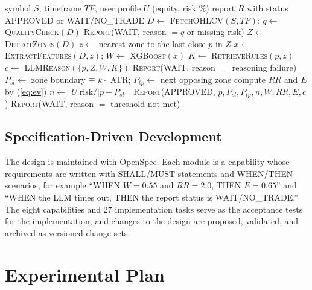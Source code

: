 \documentclass[conference]{IEEEtran}
\begin{document}
\begin{algorithm}[t]
\caption{Hybrid TPA-Agent Analysis Cycle}
\label{alg:tpa}
\small
\begin{algorithmic}[1]
\Require symbol $S$, timeframe $TF$, user profile $U$ (equity, risk \%)
\Ensure report $R$ with status APPROVED or WAIT/NO\_TRADE
\State $D \gets$ \textsc{FetchOHLCV}$(S, TF)$; $q \gets$ \textsc{QualityCheck}$(D)$
  \State \Return \textsc{Report}(WAIT, reason $=q$ or missing risk)
\EndIf
\State $Z \gets$ \textsc{DetectZones}$(D)$ 
\State $z \gets$ nearest zone to the last close $p$ in $Z$
\State $x \gets$ \textsc{ExtractFeatures}$(D, z)$; $W \gets$ \textsc{XGBoost}$(x)$ 
\State $K \gets$ \textsc{RetrieveRules}$(p, z)$
\State $c \gets$ \textsc{LLMReason}$(\{p, Z, W, K\})$ 
  \State \Return \textsc{Report}(WAIT, reason $=$ reasoning failure)
\EndIf
\State $P_{sl} \gets$ zone boundary $\mp$ $k \cdot$ ATR; $P_{tp} \gets$ next opposing zone
\State compute $RR$ and $E$ by (\ref{eq:ev}) 
  \State $n \gets \lfloor U.\text{risk} / |p - P_{sl}| \rfloor$
  \State \Return \textsc{Report}(APPROVED, $p, P_{sl}, P_{tp}, n, W, RR, E, c$) 
\Else
  \State \Return \textsc{Report}(WAIT, reason $=$ threshold not met)
\EndIf
\end{algorithmic}
\end{algorithm}

\subsection{Specification-Driven Development}
The design is maintained with OpenSpec. Each module is a capability whose requirements are written with SHALL/MUST statements and WHEN/THEN scenarios, for example ``WHEN $W=0.55$ and $RR=2.0$, THEN $E=0.65$'' and ``WHEN the LLM times out, THEN the report status is WAIT/NO\_TRADE.'' The eight capabilities and 27 implementation tasks serve as the acceptance tests for the implementation, and changes to the design are proposed, validated, and archived as versioned change sets.

\section{Experimental Plan}\label{sec:eval}
\end{document}
